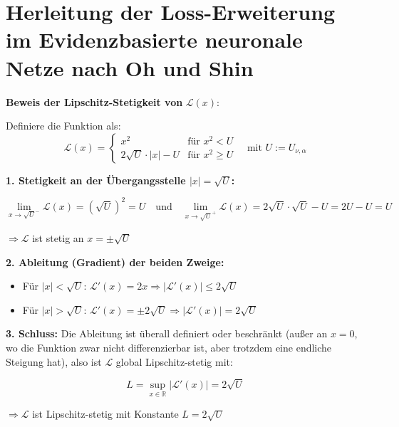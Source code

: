 \pagebreak

\section*{Herleitung der Loss-Erweiterung im \gls{Evidenzbasierte neuronale Netze} nach Oh und Shin}
\label{sec:enn_derivation__lipschitz_component}

\textbf{Beweis der Lipschitz-Stetigkeit von } \( \mathcal{L}(x) \):

\vspace{1em}

Definiere die Funktion als:
\[
\mathcal{L}(x) =
\begin{cases}
x^2 & \text{für } x^2 < U \\
2\sqrt{U} \cdot |x| - U & \text{für } x^2 \geq U
\end{cases}
\quad \text{mit } U := U_{\nu,\alpha}
\]

\textbf{1. Stetigkeit an der Übergangsstelle \( |x| = \sqrt{U} \):}

\[
\lim_{x \to \sqrt{U}^{-}} \mathcal{L}(x) = (\sqrt{U})^2 = U
\quad \text{und} \quad
\lim_{x \to \sqrt{U}^{+}} \mathcal{L}(x) = 2\sqrt{U} \cdot \sqrt{U} - U = 2U - U = U
\]

\(\Rightarrow \mathcal{L} \) ist stetig an \( x = \pm\sqrt{U} \)

\vspace{1em}

\textbf{2. Ableitung (Gradient) der beiden Zweige:}

\begin{itemize}
  \item Für \( |x| < \sqrt{U} \): \( \mathcal{L}'(x) = 2x \Rightarrow |\mathcal{L}'(x)| \leq 2\sqrt{U} \)
  \item Für \( |x| > \sqrt{U} \): \( \mathcal{L}'(x) = \pm 2\sqrt{U} \Rightarrow |\mathcal{L}'(x)| = 2\sqrt{U} \)
\end{itemize}

\textbf{3. Schluss:} Die Ableitung ist überall definiert oder beschränkt (außer an \( x = 0 \), wo die Funktion zwar nicht differenzierbar ist, aber trotzdem eine endliche Steigung hat), also ist \( \mathcal{L} \) global Lipschitz-stetig mit:

\[
L = \sup_{x \in \mathbb{R}} |\mathcal{L}'(x)| = 2\sqrt{U}
\]

\(\Rightarrow \mathcal{L} \) ist Lipschitz-stetig mit Konstante \( L = 2\sqrt{U} \)